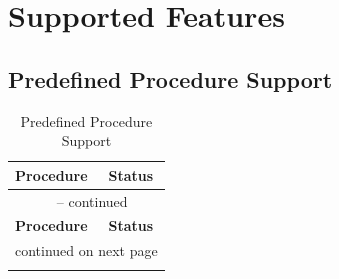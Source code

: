 \chapter{Supported Features}

\section{Predefined Procedure Support}
\label{sec:predefined-procedure-support}
\begin{longtable}{|p{4cm}|p{9cm}|}
    \caption{Predefined Procedure Support}
    \label{tab:predefined} \\
    \hline
    \textbf{Procedure} & \textbf{Status} \\
    \hline
    \endfirsthead

    \multicolumn{2}{c}{\tablename\ \thetable{} -- continued} \\
    \hline
    \textbf{Procedure} & \textbf{Status} \\
    \hline
    \endhead

    \hline
    \multicolumn{2}{r}{continued on next page} \\
    \endfoot


\end{longtable}

